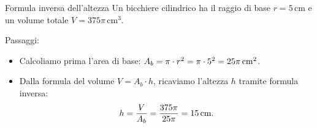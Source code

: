 \condnewpage

\begin{esercizio}{Formula inversa dell'altezza}
Un bicchiere cilindrico ha il raggio di base $r = 5\,\mathrm{cm}$ e un volume totale $V = 375\pi\,\mathrm{cm^3}$.


\responsespace{5.5cm}

\begin{soluzione}
  Passaggi:
  \begin{itemize}
    \item Calcoliamo prima l'area di base: $A_b = \pi \cdot r^2 = \pi \cdot 5^2 = 25\pi\,\mathrm{cm^2}$.
    \item Dalla formula del volume $V = A_b \cdot h$, ricaviamo l'altezza $h$ tramite formula inversa:
    \[
    h = \frac{V}{A_b} = \frac{375\pi}{25\pi} = 15\,\mathrm{cm}.
    \]
  \end{itemize}
\end{soluzione}
\end{esercizio}

\condnewpage

